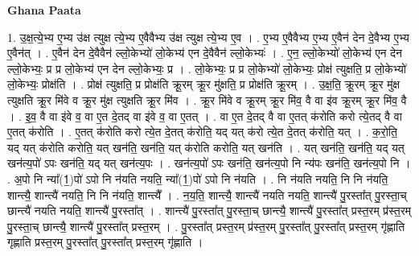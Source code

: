 \documentclass[17pt]{extarticle}
\begin{document}
\textbf{Ghana Paata } \newline

1. उ॒क्ष॒त्ये॒भ्य ए॒भ्य उ॑क्ष त्युक्ष त्ये॒भ्य ए॒वैवैभ्य उ॑क्ष त्युक्ष त्ये॒भ्य ए॒व । . ए॒भ्य ए॒वैवैभ्य ए॒भ्य ए॒वैन॑ देन दे॒वैभ्य ए॒भ्य ए॒वैन॑त् । . ए॒वैन॑ देन दे॒वैवैन॑ ल्लो॒केभ्यो॑ लो॒केभ्य॑ एन दे॒वैवैन॑ ल्लो॒केभ्यः॑ । . ए॒न॒ ल्लो॒केभ्यो॑ लो॒केभ्य॑ एन देन ल्लो॒केभ्यः॒ प्र प्र लो॒केभ्य॑ एन देन ल्लो॒केभ्यः॒ प्र । . लो॒केभ्यः॒ प्र प्र लो॒केभ्यो॑ लो॒केभ्यः॒ प्रोक्ष॑ त्युक्षति॒ प्र लो॒केभ्यो॑ लो॒केभ्यः॒ प्रोक्ष॑ति । . प्रोक्ष॑ त्युक्षति॒ प्र प्रोक्ष॑ति क्रू॒रम् क्रू॒र मु॑क्षति॒ प्र प्रोक्ष॑ति क्रू॒रम् । . उ॒क्ष॒ति॒ क्रू॒रम् क्रू॒र मु॑क्ष त्युक्षति क्रू॒र मि॑वे व क्रू॒र मु॑क्ष त्युक्षति क्रू॒र मि॑व । . क्रू॒र मि॑वे व क्रू॒रम् क्रू॒र मि॑व॒ वै वा इ॑व क्रू॒रम् क्रू॒र मि॑व॒ वै । . इ॒व॒ वै वा इ॑वे व॒ वा ए॒त दे॒तद् वा इ॑वे व॒ वा ए॒तत् । . वा ए॒त दे॒तद् वै वा ए॒तत् क॑रोति करो त्ये॒तद् वै वा ए॒तत् क॑रोति । . ए॒तत् क॑रोति करो त्ये॒त दे॒तत् क॑रोति॒ यद् यत् क॑रो त्ये॒त दे॒तत् क॑रोति॒ यत् । . क॒रो॒ति॒ यद् यत् क॑रोति करोति॒ यत् खन॑ति॒ खन॑ति॒ यत् क॑रोति करोति॒ यत् खन॑ति । . यत् खन॑ति॒ खन॑ति॒ यद् यत् खन॑त्य॒पो॑ ऽपः खन॑ति॒ यद् यत् खन॑त्य॒पः । . खन॑त्य॒पो॑ ऽपः खन॑ति॒ खन॑त्य॒पो नि न्य॑पः खन॑ति॒ खन॑त्य॒पो नि । . अ॒पो नि न्या᳚(1॒)पो॑ ऽपो नि न॑यति नयति॒ न्या᳚(1॒)पो॑ ऽपो नि न॑यति । . नि न॑यति नयति॒ नि नि न॑यति॒ शान्त्यै॒ शान्त्यै॑ नयति॒ नि नि न॑यति॒ शान्त्यै᳚ । . न॒य॒ति॒ शान्त्यै॒ शान्त्यै॑ नयति नयति॒ शान्त्यै॑ पु॒रस्ता᳚त् पु॒रस्ता॒च् छान्त्यै॑ नयति नयति॒ शान्त्यै॑ पु॒रस्ता᳚त् । . शान्त्यै॑ पु॒रस्ता᳚त् पु॒रस्ता॒च् छान्त्यै॒ शान्त्यै॑ पु॒रस्ता᳚त् प्रस्त॒रम् प्र॑स्त॒रम् पु॒रस्ता॒च् छान्त्यै॒ शान्त्यै॑ पु॒रस्ता᳚त् प्रस्त॒रम् । . पु॒रस्ता᳚त् प्रस्त॒रम् प्र॑स्त॒रम् पु॒रस्ता᳚त् पु॒रस्ता᳚त् प्रस्त॒रम् गृ॑ह्णाति गृह्णाति प्रस्त॒रम् पु॒रस्ता᳚त् पु॒रस्ता᳚त् प्रस्त॒रम् गृ॑ह्णाति । \newline
\end{document}
